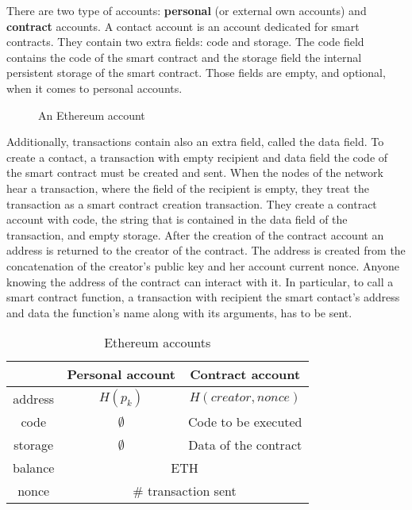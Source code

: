 There are two type of accounts: \textbf{personal} (or external own accounts) and \textbf{contract} accounts. A contact account is an account dedicated for smart contracts. They contain two extra fields: code and storage. The code field contains the code of the smart contract and the storage field the internal persistent storage of the smart contract. Those fields are empty, and optional, when it comes to personal accounts.

\begin{figure}[!ht]
  \centering
  \caption{An Ethereum account}
  \label{fig:eth_account}
\end{figure}

Additionally, transactions contain also an extra field, called the data field. To create a contact, a transaction with empty recipient and data field the code of the smart contract must be created and sent. When the nodes of the network hear a transaction, where the field of the recipient is empty, they treat the transaction as a smart contract creation transaction. They create a contract account with code, the string that is contained in the data field of the transaction, and empty storage. After the creation of the contract account an address is returned to the creator of the contract. The address is created from the concatenation of the creator's public key and her account current nonce. Anyone knowing the address of the contract can interact with it. In particular, to call a smart contract function, a transaction with recipient the smart contact's address and data the function's name along with its arguments, has to be sent.

\begin{table}[!ht]
  \centering
  \begin{tabular}{|c|c|c|}
  \hline
   & Personal account  & Contract account \\ \hline
   address & $H(p_k)$ & $H(creator, nonce)$ \\ \hline
   code & $\emptyset$ & Code to be executed \\ \hline
   storage & $\emptyset$ & Data of the contract \\ \hline
   balance & \multicolumn{2}{c|}{ETH} \\ \hline
   nonce &  \multicolumn{2}{c|}{\# transaction sent}  \\ \hline
  \end{tabular}
  \caption{Ethereum accounts}
  \label{fig:eth_accounts}
\end{table}


